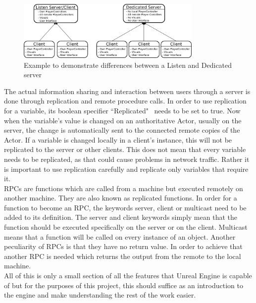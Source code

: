 \begin{figure}[htpb]
	\centering
	\includegraphics[width=0.8\textwidth]{fig/ListenvsDedicated.pdf}
	\caption[Difference between Listen and Dedicated Server]{Example to demonstrate differences between a Listen and Dedicated server\protect}
	\label{fig:ListenvDedicated}
\end{figure}

The actual information sharing and interaction between users through a server is done through replication and remote procedure calls\cite{bib:NetworkComp}. In order to use replication for a variable, its boolean specifier ``Replicated" ~needs to be set to true. Now when the variable's value is changed on an authoritative Actor, usually on the server, the change is automatically sent to the connected remote copies of the Actor. If a variable is changed locally in a client's instance, this will not be replicated to the server or other clients. This does not mean that every variable needs to be replicated, as that could cause problems in network traffic. Rather it is important to use replication carefully and replicate only variables that require it.\\
\acp{RPC} are functions which are called from a machine but executed remotely on another machine. They are also known as replicated functions\cite{bib:NetworkComp}. In order for a function to become an RPC, the keywords server, client or multicast need to be added to its definition. The server and client keywords simply mean that the function should be executed specifically on the server or on the client. Multicast means that a function will be called on every instance of an object. Another peculiarity of RPCs is that they have no return value. In order to achieve that another RPC is needed which returns the output from the remote to the local machine.\\
All of this is only a small section of all the features that Unreal Engine is capable of but for the purposes of this project, this should suffice as an introduction to the engine and make understanding the rest of the work easier.





